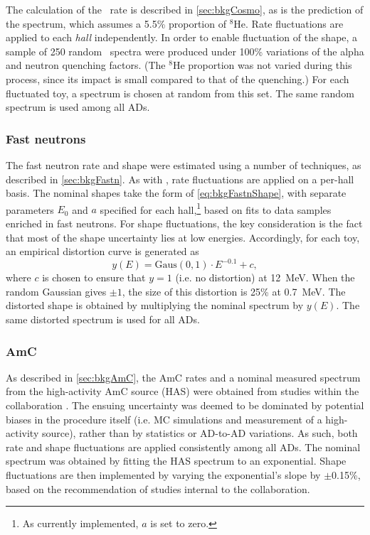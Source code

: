 \documentclass[../thesis.tex]{subfiles}
\begin{document}
The calculation of the \LiHe\ rate is described in \autoref{sec:bkgCosmo}, as is the prediction of the spectrum, which assumes a 5.5\% proportion of $^8$He. Rate fluctuations are applied to each \emph{hall} independently. In order to enable fluctuation of the shape, a sample of 250 random \LiHe\ spectra were produced under 100\% variations of the alpha and neutron quenching factors. (The $^8$He proportion was not varied during this process, since its impact is small compared to that of the quenching.) For each fluctuated toy, a spectrum is chosen at random from this set. The same random spectrum is used among all ADs.

\subsubsection{Fast neutrons}

The fast neutron rate and shape were estimated using a number of techniques, as described in \autoref{sec:bkgFastn}. As with \LiHe, rate fluctuations are applied on a per-hall basis. The nominal shapes take the form of \autoref{eq:bkgFastnShape}, with separate parameters $E_0$ and $a$ specified for each hall,\footnote{As currently implemented, $a$ is set to zero.} based on fits to data samples enriched in fast neutrons. For shape fluctuations, the key consideration is the fact that most of the shape uncertainty lies at low energies. Accordingly, for each toy, an empirical distortion curve is generated as
\begin{equation}
  y(E) = \mathrm{Gaus}(0,1) \cdot E^{-0.1} + c,
\end{equation}
where $c$ is chosen to ensure that $y = 1$ (i.e. no distortion) at 12~MeV. When the random Gaussian gives $\pm 1$, the size of this distortion is 25\% at 0.7~MeV. The distorted shape is obtained by multiplying the nominal spectrum by $y(E)$. The same distorted spectrum is used for all ADs.

\subsubsection{AmC}

As described in \autoref{sec:bkgAmC}, the AmC rates and a nominal measured spectrum from the high-activity AmC source (HAS) were obtained from studies within the collaboration \cite{AmC_paper}. The ensuing uncertainty was deemed to be dominated by potential biases in the procedure itself (i.e. MC simulations and measurement of a high-activity source), rather than by statistics or AD-to-AD variations. As such, both rate and shape fluctuations are applied consistently among all ADs. The nominal spectrum was obtained by fitting the HAS spectrum to an exponential. Shape fluctuations are then implemented by varying the exponential's slope by $\pm$0.15\%, based on the recommendation of studies internal to the collaboration.
\end{document}
